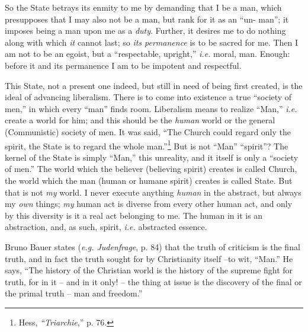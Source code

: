 \documentclass[12pt,a4paper]{book}
\begin{document}
So the State betrays its enmity to me by demanding that I be a man, which 
presupposes that I may also not be a man, but rank for it as an ``un- man''; 
it imposes being a man upon me as a \textit{duty}. Further, it desires me to 
do nothing along with which \textit{it} cannot last; so \textit{its 
permanence} is to be sacred for me. Then I am not to be an egoist, but a 
``respectable, upright,'' \textit{i.e.} moral, man. Enough: before it and 
its permanence I am to be impotent and respectful.

This State, not a present one indeed, but still in need of being first 
created, is the ideal of advancing liberalism. There is to come into existence 
a true ``society of men,'' in which every ``man'' finds room. Liberalism 
means to realize ``Man,'' \textit{i.e.} create a world for him; and this 
should be the \textit{human} world or the general (Communistic) society of 
men. It was said, ``The Church could regard only the spirit, the State is to 
regard the whole man.''\footnote{Hess, \textit{``Triarchie},'' p. 76.} But 
is not ``Man'' ``spirit''? The kernel of the State is simply ``Man,'' 
this unreality, and it itself is only a ``society of men.'' The world which 
the believer (believing spirit) creates is called Church, the world which the 
man (human or humane spirit) creates is called State. But that is not 
\textit{my} world. I never execute anything \textit{human} in the abstract, 
but always my \textit{own} things; \textit{my} human act is diverse from every 
other human act, and only by this diversity is it a real act belonging to me. 
The human in it is an abstraction, and, as such, spirit, \textit{i.e.} 
abstracted essence.

Bruno Bauer states (\textit{e.g. Judenfrage}, p. 84) that the truth of 
criticism is the final truth, and in fact the truth sought for by Christianity 
itself --to wit, ``Man.'' He says, ``The history of the Christian world is 
the history of the supreme fight for truth, for in it -- and in it only! -- 
the thing at issue is the discovery of the final or the primal truth -- man 
and freedom.''
\end{document}
